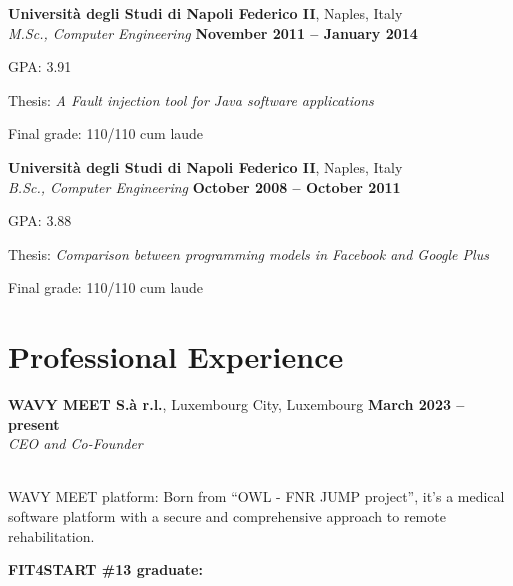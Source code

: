 \documentclass[margin,line]{resume}
\begin{document}
\begin{resume}
\textbf{Universit\`a degli Studi di Napoli Federico II}, Naples, Italy \vspace{1mm}\\%
\textsl{M.Sc., Computer Engineering} \hfill \textbf{November 2011 -- January 2014}\vspace{-3mm}\\\vspace{-1mm}%
\begin{list2}
	\item GPA: 3.91
	\item Thesis: \textsl{A Fault injection tool for Java software applications}
	\item Final grade: 110/110 cum laude
\end{list2}\vspace{-1.5mm}    


\textbf{Universit\`a degli Studi di Napoli Federico II}, Naples, Italy \vspace{1mm}\\%
\textsl{B.Sc., Computer Engineering} \hfill \textbf{October 2008 -- October 2011}\vspace{-3mm}\\\vspace{-1mm}%
\begin{list2}
	\item GPA: 3.88
	\item Thesis: \textsl{Comparison between programming models in Facebook and Google Plus}
        \item Final grade: 110/110 cum laude
\end{list2}\vspace{-1.5mm}    


\section{\mysidestyle Professional Experience}

\textbf{WAVY MEET S.à r.l.}, Luxembourg City, Luxembourg \hfill \textbf{March 2023 -- present}\\
\textit{CEO and Co-Founder}\hfill\\
\vspace{-3mm}\\\vspace{-1mm}
\begin{list2}
	\item \filbreak WAVY MEET platform: Born from ``OWL - FNR JUMP project'', it's a medical software platform with a secure and comprehensive approach to remote rehabilitation.
	\item \filbreak\textbf{FIT4START \#13 graduate:} 
	

\end{list2}
\end{resume}
\end{document}
